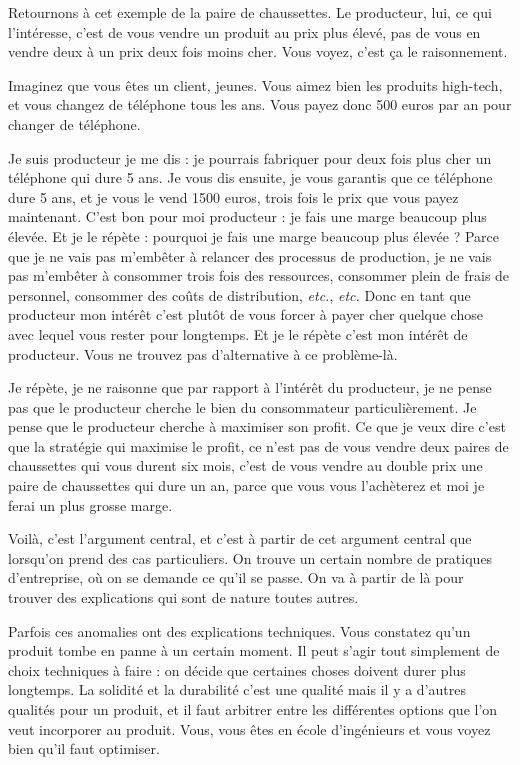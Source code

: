 \begin{small}
Retournons à cet exemple de la paire de chaussettes. Le producteur, lui, ce qui l'intéresse, c'est de vous vendre un produit au prix plus élevé, pas de vous en vendre deux à un prix deux fois moins cher. Vous voyez, c'est ça le raisonnement. 

\smallbreak 
Imaginez que vous êtes un client, jeunes. Vous aimez bien les produits high-tech, et vous changez de téléphone tous les ans. Vous payez  donc 500 euros par an pour changer de téléphone. 

Je suis producteur je me dis : je pourrais fabriquer  pour deux fois plus cher un téléphone qui dure 5 ans. Je vous dis ensuite, je vous garantis que ce téléphone dure 5 ans, et je vous le vend 1500 euros, trois fois le prix que vous payez maintenant. C'est bon pour moi producteur : je fais une marge beaucoup plus élevée. Et je le répète : pourquoi je fais une marge beaucoup plus élevée ? Parce que je ne vais pas m'embêter à relancer des processus de production, je ne vais pas m'embêter à consommer trois fois des ressources, consommer plein de frais de  personnel, consommer des coûts de distribution, \textit{etc.}, \textit{etc.} Donc en tant que producteur mon intérêt c'est plutôt de vous \og forcer \fg{}  à payer cher quelque chose avec lequel vous rester pour longtemps. Et je le répète c'est mon intérêt de producteur. Vous ne trouvez pas d'alternative à ce problème-là. 

Je répète, je ne raisonne que par rapport à l'intérêt du producteur, je ne pense pas que le producteur cherche le bien du consommateur particulièrement. Je pense que le producteur cherche à maximiser son profit. Ce que je veux dire c'est que la stratégie qui maximise le profit, ce n'est pas de vous vendre deux paires de chaussettes qui vous durent six mois, c'est de vous vendre au double prix une paire de chaussettes qui dure un an, parce que vous vous l'achèterez et moi je ferai un plus grosse marge. 

Voilà,  c'est l'argument central, et c'est à partir de cet argument central que lorsqu'on prend des cas particuliers. On trouve un certain nombre de pratiques d'entreprise, où on se demande ce qu'il se passe. On va à partir de là pour trouver  des explications qui sont de nature toutes autres.  

Parfois ces anomalies ont des explications techniques. Vous constatez qu'un produit tombe en panne à un certain moment. Il peut s'agir tout simplement de  choix techniques à faire : on décide que certaines choses doivent durer plus longtemps. La solidité et la durabilité c'est une qualité mais il y a d'autres qualités pour un produit, et il faut arbitrer entre les différentes options que l'on veut incorporer au produit. Vous, vous êtes en école d'ingénieurs et vous voyez bien qu'il faut optimiser. 


\end{small}
